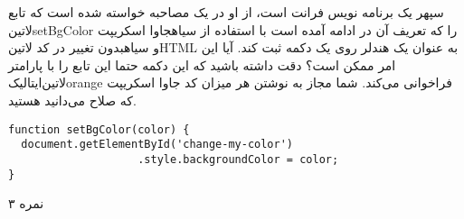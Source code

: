 
سپهر یک برنامه نویس فرانت است، از او در یک مصاحبه خواسته شده است
که تابع ‌لاتین{setBgColor}
را که تعریف آن در ادامه آمده است با استفاده از ‌سیاه{جاوا اسکریپت}
و ‌سیاه{بدون}
تغییر در کد ‌لاتین{HTML}
به عنوان یک هندلر روی یک دکمه ثبت کند. آیا این امر ممکن است؟
دقت داشته باشید که این دکمه حتما این تابع را با پارامتر ‌لاتین{‌ایتالیک{orange}}
فراخوانی می‌کند.
شما مجاز به نوشتن هر میزان کد جاوا اسکریپت که صلاح می‌دانید هستید.

\begin{latin}
\begin{verbatim}
function setBgColor(color) {
  document.getElementById('change-my-color')
                    .style.backgroundColor = color;
}
\end{verbatim}
\end{latin}

۳ نمره
